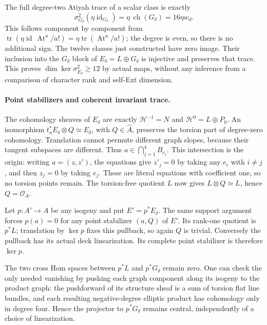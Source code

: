 The full degree-two Atiyah trace of a scalar class is exactly
\[
 \sigma^2_{G_\delta}(\eta\operatorname{id}_{G_\delta})
     =\eta\,\operatorname{ch}(G_\delta)=16\eta w_d.
\]
This follows component by component from
\(\operatorname{tr}(\eta\operatorname{id}\,\operatorname{At}^a/a!)
=\eta\operatorname{tr}(\operatorname{At}^a/a!)\); the degree is
even, so there is no additional sign. The twelve classes just
constructed have zero image. Their inclusion into the \(G_\delta\)
block of \(E_\delta=L\oplus G_\delta\) is injective and preserves
that trace. This proves \(\dim\ker\sigma^2_{E_\delta}\ge12\)
by actual maps, without any inference from a comparison of character
rank and self-Ext dimension.

\paragraph{Point stabilizers and coherent invariant trace.}
The cohomology sheaves of \(E_\delta\) are exactly
\(\mathcal H^{-1}=N\) and \(\mathcal H^0=L\oplus P_0\).
An isomorphism \(t_a^*E_\delta\otimes Q\simeq E_\delta\),
with \(Q\in\widehat A\), preserves the torsion part of degree-zero
cohomology. Translation cannot permute different graph slopes,
because their tangent subspaces are different. Thus
\(a\in\bigcap_{j=1}^4B_{e_j}\). This intersection is the origin:
writing \(a=(z,z')\), the equations give \(z'_j=0\) by taking
any \(e_i\) with \(i\ne j\), and then \(z_j=0\) by taking
\(e_j\). These are literal equations with coefficient one, so no
torsion points remain. The torsion-free quotient \(L\) now gives
\(L\otimes Q\simeq L\), hence \(Q=\mathcal O_A\).

Let \(p:A'\to A\) be any isogeny and put \(E'=p^*E_\delta\).
The same support argument forces \(p(a)=0\) for any point stabilizer
\((a,Q)\) of \(E'\). Its rank-one quotient is \(p^*L\);
translation by \(\ker p\) fixes this pullback, so again \(Q\) is
trivial. Conversely the pullback has its actual deck linearization.
Its complete point stabilizer is therefore \(\ker p\).

The two cross Hom spaces between \(p^*L\) and \(p^*G_\delta\)
remain zero. One can check the only needed vanishing by pushing each
graph component along its isogeny to the product graph: the pushforward
of its structure sheaf is a sum of torsion flat line bundles, and
each resulting negative-degree elliptic product has cohomology only
in degree four. Hence the projector to \(p^*G_\delta\) remains
central, independently of a choice of linearization.

